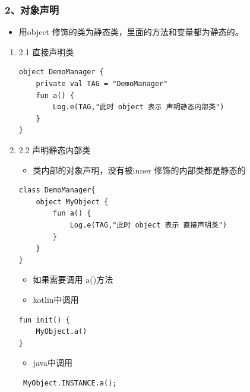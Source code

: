 \documentclass[9pt, b5paper]{article}
\begin{document}
\subsubsection{2、对象声明}
\label{sec-3-1-2}
\begin{itemize}
\item 用object 修饰的类为静态类，里面的方法和变量都为静态的。
\end{itemize}
\begin{enumerate}
\item 2.1 直接声明类
\label{sec-3-1-2-1}
\begin{verbatim}
object DemoManager {
    private val TAG = "DemoManager"
    fun a() {
        Log.e(TAG,"此时 object 表示 声明静态内部类")
    }
}
\end{verbatim}
\item 2.2 声明静态内部类
\label{sec-3-1-2-2}
\begin{itemize}
\item 类内部的对象声明，没有被inner 修饰的内部类都是静态的
\end{itemize}
\begin{verbatim}
class DemoManager{
    object MyObject {
        fun a() {
            Log.e(TAG,"此时 object 表示 直接声明类")
        }
    }
}
\end{verbatim}
\begin{itemize}
\item 如果需要调用 a()方法
\item kotlin中调用
\end{itemize}
\begin{verbatim}
fun init() {
    MyObject.a()
}
\end{verbatim}
\begin{itemize}
\item java中调用
\end{itemize}
\begin{verbatim}
 MyObject.INSTANCE.a();
\end{verbatim}
\end{enumerate}
\end{document}
